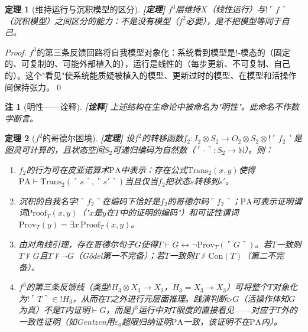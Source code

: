 \documentclass[11pt,a4paper]{article}
\newtheorem{theorem}{定理}
\newtheorem{remark}{注}
\newcommand{\lvl}[1]{\hfill\textbf{\footnotesize[#1]}}
\newcommand{\lvP}{\lvl{定理}}
\newcommand{\lvI}{\lvl{诠释}}
\newcommand{\lolli}{\multimap}
\newcommand{\bang}{{!}}
\newcommand{\tensor}{\otimes}
\begin{document}
\begin{theorem}[维持运行与沉积模型的区分]\label{thm:mingxing}\lvP
$f^3$层维持$X$（线性运行）与$\bang\ulcorner f\urcorner$（沉积模型）之间区分的能力：不是没有模型（$f^2$必要），是不把模型等同于自己。
\end{theorem}

\begin{proof}
$f^3$的第三条反馈回路将自我模型对象化：系统看到模型是$\bang$-模态的（固定的、可复制的、可能外部植入的），运行是线性的（每步更新、不可复制、自己的）。这个"看见"使系统能质疑被植入的模型、更新过时的模型、在模型和活操作间保持张力。\qed
\end{proof}

\begin{remark}[明性——诠释]\lvI
上述结构在生命论中被命名为"明性"。此命名不作数学断言。
\end{remark}

\begin{theorem}[$f^2$的哥德尔困境]\label{thm:godel-f2}\lvP
设$f^2$的转移函数$f_2:I_2\tensor S_2\to O_2\tensor S_2\tensor\bang\ulcorner f_2\urcorner$是图灵可计算的，且状态空间$S_2$可递归编码为自然数（$\ulcorner\cdot\urcorner:S_2\to\mathbb{N}$）。则：
\begin{enumerate}
  \item $f_2$的行为可在皮亚诺算术$\mathrm{PA}$中表示：存在公式$\mathrm{Trans}_2(x,y)$使得$\mathrm{PA}\vdash\mathrm{Trans}_2(\ulcorner s\urcorner,\ulcorner s'\urcorner)$当且仅当$f_2$把状态$s$转移到$s'$。
  \item 沉积的自我名字$\bang\ulcorner f_2\urcorner$在编码下恰好是$f_2$的哥德尔码$\ulcorner f_2\urcorner$；$\mathrm{PA}$可表示证明谓词$\mathrm{Proof}_T(x,y)$（"$x$是$y$在$T$中的证明的编码"）和可证性谓词$\mathrm{Prov}_T(y)=\exists x\,\mathrm{Proof}_T(x,y)$。
  \item 由对角线引理，存在哥德尔句子$G$使得$T\vdash G\leftrightarrow\neg\mathrm{Prov}_T(\ulcorner G\urcorner)$。若$T$一致则$T\nvdash G$且$T\nvdash\neg G$（G\"odel第一不完备）；若$T$一致则$T\nvdash\mathrm{Con}(T)$（第二不完备）。
  \item $f^3$的第三条反馈线（类型$\bang H_3\tensor X_3\to X_3$，$H_3=X_3\lolli X_3$）可将整个$T$对象化为$\bang\ulcorner T\urcorner\in\bang H_3$，从而在$T$\emph{之外}进行元层面推理。践演判断$\triangleright G$（活操作体知$G$为真）不是$T$内证明$\vdash G$，而是$f^3$运行中对$T$限度的直接看见——对应于$T$外的一致性证明（如Gentzen用$\varepsilon_0$超限归纳证明$\mathrm{PA}$一致，该证明不在$\mathrm{PA}$内）。
\end{enumerate}
\end{theorem}
\end{document}
